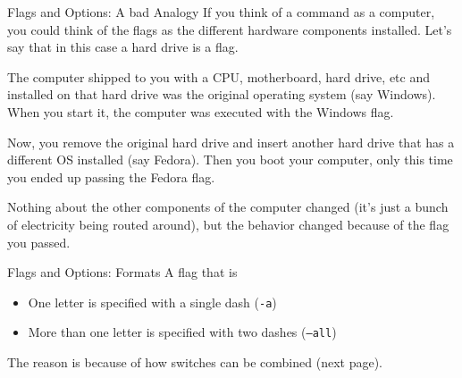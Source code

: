 \documentclass[11pt]{beamer}
\begin{document}
\begin{frame}[fragile]{Flags and Options: A bad Analogy}
  If you think of a command as a computer, you could think of the flags as the different
  hardware components installed.  Let's say that in this case a hard drive is a flag.

  The computer shipped to you with a CPU, motherboard, hard drive, etc and installed on that hard drive
  was the original operating system (say Windows).  When you start it, the computer was executed with the Windows flag.

  Now, you remove the original hard drive and insert another hard drive that has a different OS installed
  (say Fedora).  Then you boot your computer, only this time you ended up passing the Fedora flag.

  Nothing about the other components of the computer changed (it's just a bunch of electricity being routed around),
  but the behavior changed because of the flag you passed.
\end{frame}

\begin{frame}[fragile]{Flags and Options: Formats}
  A flag that is
  \begin{itemize}
    \item One letter is specified with a single dash (\texttt{-a})
    \item More than one letter is specified with two dashes (\texttt{--all})
  \end{itemize}
  The reason is because of how switches can be combined (next page).
\end{frame}
\end{document}

